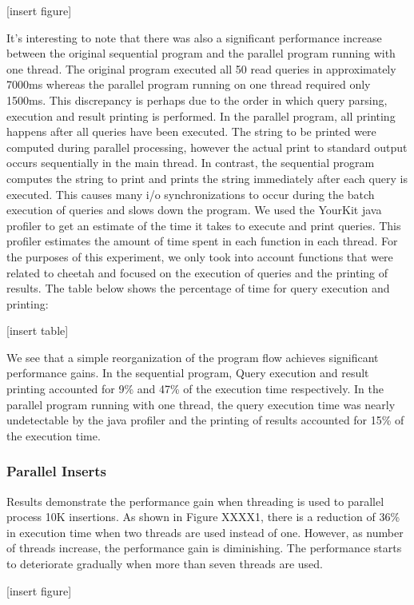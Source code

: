 \documentclass[11pt,journal,compsoc]{IEEEtran}
\begin{document}
[insert figure]

It’s interesting to note that there was also a significant performance increase between the original sequential program and the parallel program running with one thread. The original program executed all 50 read queries in approximately 7000ms whereas the parallel program running on one thread required only 1500ms. This discrepancy is perhaps due to the order in which query parsing, execution and result printing is performed. In the parallel program, all printing happens after all queries have been executed. The string to be printed were computed during parallel processing, however the actual print to standard output occurs sequentially in the main thread. In contrast, the sequential program computes the string to print and prints the string immediately after each query is executed. This causes many i/o synchronizations to occur during the batch execution of queries and slows down the program. We used the YourKit java profiler to get an estimate of the time it takes to execute and print queries. This profiler estimates the amount of time spent in each function in each thread. For the purposes of this experiment, we only took into account functions that were related to cheetah and focused on the execution of queries and the printing of results. The table below shows the percentage of time for query execution and printing:

[insert table]

 We see that a simple reorganization of the program flow achieves significant performance gains. In the sequential program, Query execution and result printing accounted for 9\% and 47\% of the execution time respectively. In the parallel program running with one thread, the query execution time was nearly undetectable by the java profiler and the printing of results accounted for 15\% of the execution time. 


\subsubsection{Parallel Inserts}
Results demonstrate the performance gain when threading is used to parallel process 10K insertions. As shown in Figure XXXX1, there is a reduction of 36\% in execution time when two threads are used instead of one. However, as number of threads increase, the performance gain is diminishing. The performance starts to deteriorate gradually when more than seven threads are used.

[insert figure]
\end{document}
